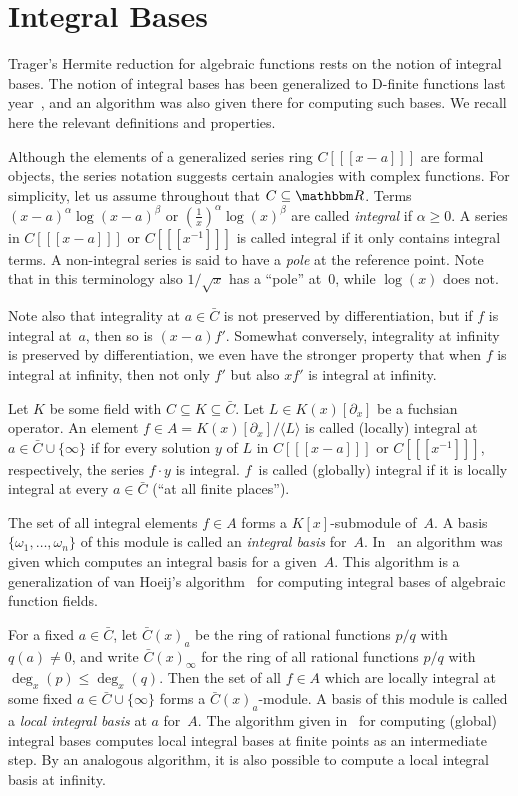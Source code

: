 \documentclass{sig-alternate}
\def\<#1>{\langle#1\rangle}
\let\set\mathbbm
\begin{document}
\section{Integral Bases}

Trager's Hermite reduction for algebraic functions rests on the notion of
integral bases. The notion of integral bases has been generalized to D-finite
functions last year~\cite{kauers15b}, and an algorithm was also given there for
computing such bases. We recall here the relevant definitions and properties.

Although the elements of a generalized series ring $C[[[x-a]]]$ are formal
objects, the series notation suggests certain analogies with complex
functions.  For simplicity, let us assume throughout that $C\subseteq\set
R$. Terms $(x-a)^\alpha\log(x-a)^\beta$ or $(\tfrac1x)^\alpha\log(x)^\beta$ are
called \emph{integral} if $\alpha\geq0$. A series in
$C[[[x-a]]]$ or $C[[[x^{-1}]]]$ is called integral if it only contains integral
terms. A non-integral series is said to have a \emph{pole} at the reference
point. Note that in this terminology also $1/\sqrt{x}$ has a ``pole''
at~$0$, while $\log(x)$ does not.

Note also that integrality at $a\in\bar C$ is not preserved by differentiation,
but if $f$ is integral at~$a$, then so is $(x-a)f'$. Somewhat conversely,
integrality at infinity is preserved by differentiation, we even have the
stronger property that when $f$ is integral at infinity, then not only $f'$ but also $xf'$ is
integral at infinity.

Let $K$ be some field with $C\subseteq K\subseteq\bar C$.
Let $L\in K(x)[\partial_x]$ be a fuchsian operator. An element $f\in A=K(x)[\partial_x]/\<L>$
is called (locally) integral at $a\in\bar C\cup\{\infty\}$ if for every solution $y$
of $L$ in $C[[[x-a]]]$ or $C[[[x^{-1}]]]$, respectively, the series $f\cdot y$ is
integral. $f$~is called (globally) integral if it is locally integral at every
$a\in\bar C$ (``at all finite places'').

The set of all integral elements $f\in A$ forms a $K[x]$-submodule of~$A$.
A basis $\{\omega_1,\dots,\omega_n\}$ of this module is called an \emph{integral basis}
for~$A$. In~\cite{kauers15b} an algorithm was given which computes an integral basis
for a given~$A$. This algorithm is a generalization of van Hoeij's
algorithm~\cite{vanHoeij94} for computing integral bases of algebraic function
fields.

For a fixed $a\in\bar C$, let $\bar C(x)_a$ be the ring of rational functions $p/q$
with $q(a)\neq0$, and write $\bar C(x)_\infty$ for the ring of all
rational functions $p/q$ with $\deg_x(p)\leq\deg_x(q)$.
Then the set of all $f\in A$ which are locally integral at some
fixed $a\in\bar C\cup\{\infty\}$ forms a $\bar C(x)_a$-module. A basis of this module is
called a \emph{local integral basis} at $a$ for~$A$. The algorithm given in~\cite{kauers15b}
for computing (global) integral bases computes local integral bases at finite
points as an intermediate step. By an analogous algorithm, it is also possible
to compute a local integral basis at infinity.
\end{document}
